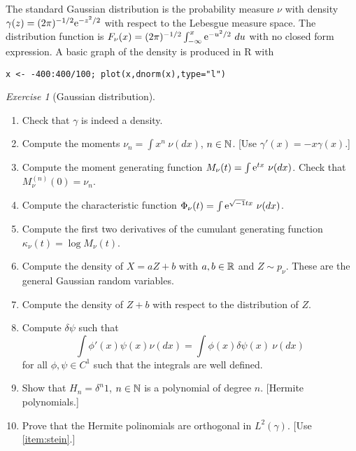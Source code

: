 \documentclass[12pt,a4paper]{amsart}
\theoremstyle{plain}%
\theoremstyle{definition}
\theoremstyle{remark}
\newtheorem{exercise}{Exercise}
\begin{document}
The standard Gaussian distribution is the probability measure $\nu$
with density $\gamma(z) = (2\pi)^{-1/2} \mathrm{e}^{-z^2/2}$ with respect
to the Lebesgue measure space. The distribution function is
$F_\nu(x) = (2\pi)^{-1/2} \int_{-\infty}^x \mathrm{e}^{-u^2/2} \ du$ with
no closed form expression. A basic graph of the density is produced in
R with
\begin{verbatim}
x <- -400:400/100; plot(x,dnorm(x),type="l")
\end{verbatim}
%
\begin{exercise}[Gaussian distribution]\ 
\begin{enumerate}
\item Check that $\gamma$ is indeed a density.
\item Compute the moments $\nu_n = \int x^n \ \nu(dx)$, $n \in \mathbb{N}$. [Use $\gamma'(x) = -x \gamma(x)$.]
\item Compute the moment generating function $M_\nu(t) = \int \mathrm{e} ^{tx} \ \nu(dx)$. Check that $M^{(n)}_\nu(0) = \nu_n$.
\item Compute the characteristic function $\Phi_\nu(t) = \int \euler ^{\sqrt{-1} tx} \ \nu(dx)$.
\item Compute the first two derivatives of the cumulant generating function $\kappa_\nu(t) = \log M_\nu(t)$.
\item Compute the density of $X = aZ + b$ with $a,b \in \mathbb{R}$ and $Z \sim p_\nu$. These are the general Gaussian random variables. 
\item Compute the density of $Z + b$ with respect to the distribution of $Z$.
\item \label{item:stein} Compute $\delta \psi$ such that
  \begin{equation*}
    \int \phi'(x) \psi(x)  \nu(dx) = \int \phi(x) \delta \psi(x) \ \nu(dx)
  \end{equation*}
for all $\phi,\psi \in C^1$ such that the integrals are well defined.
\item Show that $H_n = \delta^n 1$, $n \in \mathbb{N}$ is a polynomial of degree $n$. [Hermite polynomials.]
\item Prove that the Hermite polinomials are orthogonal in $L^2(\gamma)$. [Use \cref{item:stein}.]
\end{enumerate}  
\end{exercise}
\end{document}
